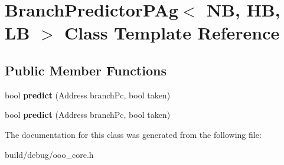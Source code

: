\hypertarget{classBranchPredictorPAg}{\section{Branch\-Predictor\-P\-Ag$<$ N\-B, H\-B, L\-B $>$ Class Template Reference}
\label{classBranchPredictorPAg}
}
\subsection*{Public Member Functions}
\begin{DoxyCompactItemize}
\item 
\hypertarget{classBranchPredictorPAg_a23a118b8dfac700a90fa7893a86a8268}{bool {\bfseries predict} (Address branch\-Pc, bool taken)}\label{classBranchPredictorPAg_a23a118b8dfac700a90fa7893a86a8268}

\item 
\hypertarget{classBranchPredictorPAg_a23a118b8dfac700a90fa7893a86a8268}{bool {\bfseries predict} (Address branch\-Pc, bool taken)}\label{classBranchPredictorPAg_a23a118b8dfac700a90fa7893a86a8268}

\end{DoxyCompactItemize}


The documentation for this class was generated from the following file\-:\begin{DoxyCompactItemize}
\item 
build/debug/ooo\-\_\-core.\-h\end{DoxyCompactItemize}
